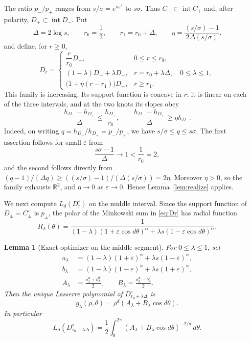 \documentclass[11pt]{article}
\newtheorem{lemma}{Lemma}
\newcommand{\R}{\mathbb R}
\newcommand{\eps}{\varepsilon}
\begin{document}
The ratio $p_-/p_+$ ranges from $s/\sigma=e^{\kappa\eps^2}$ to $s\sigma$.
Thus $C_-\subset\operatorname{int}C_+$ and, after polarity,
$D_+\subset\operatorname{int}D_-$.  Put
\[
 \Delta=2\log s,\qquad r_0=\frac12,\qquad r_1=r_0+\Delta,
 \qquad
 \eta=\frac{(s/\sigma)-1}{2\Delta(s/\sigma)}.
\]
and define, for $r\geq0$,
\begin{equation}\label{eq:Dr}
D_r=
\begin{cases}
 \dfrac{r}{r_0}D_+,&0\leq r\leq r_0,\\
 (1-\lambda)D_++\lambda D_-,&r=r_0+\lambda\Delta,
       \quad0\leq\lambda\leq1,\\
 \bigl(1+\eta(r-r_1)\bigr)D_-,&r\geq r_1.
\end{cases}
\end{equation}
This family is increasing.  Its support function is concave in $r$: it is
linear on each of the three intervals, and at the two knots its slopes obey
\[
 \frac{h_{D_-}-h_{D_+}}{\Delta}\leq\frac{h_{D_+}}{r_0},
 \qquad
 \frac{h_{D_-}-h_{D_+}}{\Delta}\geq\eta h_{D_-}.
\]
Indeed, on writing $q=h_{D_-}/h_{D_+}=p_-/p_+$, we have
$s/\sigma\leq q\leq s\sigma$.  The first assertion follows for small
$\eps$ from
\[
 \frac{s\sigma-1}{\Delta}\longrightarrow1<\frac1{r_0}=2,
\]
and the second follows directly from
$(q-1)/(\Delta q)\geq((s/\sigma)-1)/(\Delta(s/\sigma))=2\eta$.
Moreover $\eta>0$, so the family exhausts $\R^2$, and $\eta\to0$ as
$\eps\to0$.  Hence Lemma~\ref{lem:realize} applies.

We next compute $L_d(D_r^\circ)$ on the middle interval.  Since the support
function of $D_\pm=C_\pm^\circ$ is $p_\pm$, the polar of the Minkowski sum in
\eqref{eq:Dr} has radial function
\begin{equation}\label{eq:radial}
 R_\lambda(\theta)
 =\frac{1}{(1-\lambda)(1+\eps\cos d\theta)^\alpha
       +\lambda s(1-\eps\cos d\theta)^\alpha}.
\end{equation}

\begin{lemma}[Exact optimizer on the middle segment]\label{lem:optimizer}
For $0\leq\lambda\leq1$, set
\begin{align*}
 a_\lambda&=(1-\lambda)(1+\eps)^\alpha
                 +\lambda s(1-\eps)^\alpha,\\
 b_\lambda&=(1-\lambda)(1-\eps)^\alpha
                 +\lambda s(1+\eps)^\alpha,\\
 A_\lambda&=\frac{a_\lambda^d+b_\lambda^d}{2},\qquad
 B_\lambda=\frac{a_\lambda^d-b_\lambda^d}{2}.
\end{align*}
Then the unique Lasserre polynomial of $D_{r_0+\lambda\Delta}^\circ$ is
\begin{equation}\label{eq:g-lambda}
 g_\lambda(\rho,\theta)=\rho^d(A_\lambda+B_\lambda\cos d\theta).
\end{equation}
In particular
\begin{equation}\label{eq:volume}
 L_d(D_{r_0+\lambda\Delta}^\circ)
 =\frac12\int_0^{2\pi}
 (A_\lambda+B_\lambda\cos d\theta)^{-2/d}\,d\theta.
\end{equation}
\end{lemma}
\end{document}
